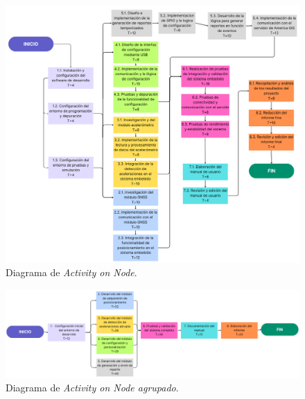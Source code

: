 \documentclass[
11pt, %
codirector, %
]{charter}
\begin{document}
\begin{figure}[htpb]
\centering 
\includegraphics[width=.88\textwidth]{./Figuras/diagrama1.png}
\caption{Diagrama de \textit{Activity on Node}.}
\label{fig:AoN}
\end{figure}

\begin{figure}[htpb]
\centering 
\includegraphics[width=.94\textwidth]{./Figuras/diagrama2.png}
\caption{Diagrama de \textit{Activity on Node agrupado}.}
\label{fig:AoN}
\end{figure}
\pagebreak
\end{document}
